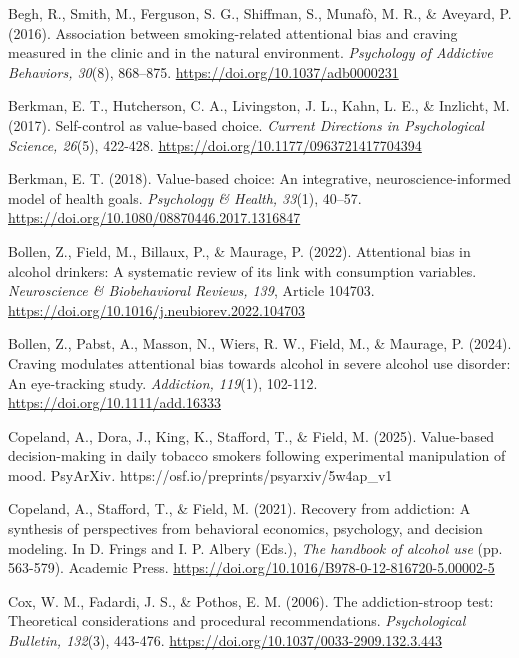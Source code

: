 \documentclass[authordate, empirical]{jote-new-article}
\begin{document}
	Begh, R., Smith, M., Ferguson, S. G., Shiffman, S., Munafò, M. R., \& Aveyard, P. (2016). Association between smoking-related attentional bias and craving measured in the clinic and in the natural environment. \emph{Psychology of Addictive Behaviors, 30}(8), 868--875. \url{https://doi.org/10.1037/adb0000231}



	Berkman, E. T., Hutcherson, C. A., Livingston, J. L., Kahn, L. E., \& Inzlicht, M. (2017). Self-control as value-based choice. \emph{Current Directions in Psychological Science, 26}(5), 422-428. \url{https://doi.org/10.1177/0963721417704394}



	Berkman, E. T. (2018). Value-based choice: An integrative, neuroscience-informed model of health goals. \emph{Psychology \& Health, 33}(1), 40--57. \url{https://doi.org/10.1080/08870446.2017.1316847}



	Bollen, Z., Field, M., Billaux, P., \& Maurage, P. (2022). Attentional bias in alcohol drinkers: A systematic review of its link with consumption variables. \emph{Neuroscience \& Biobehavioral Reviews, 139}, Article 104703. \url{https://doi.org/10.1016/j.neubiorev.2022.104703}



	Bollen, Z., Pabst, A., Masson, N., Wiers, R. W., Field, M., \& Maurage, P. (2024). Craving modulates attentional bias towards alcohol in severe alcohol use disorder: An eye-tracking study. \emph{Addiction, 119}(1), 102-112. \url{https://doi.org/10.1111/add.16333}



	Copeland, A., Dora, J., King, K., Stafford, T., \& Field, M. (2025). Value-based decision-making in daily tobacco smokers following experimental manipulation of mood. PsyArXiv\emph{. }https://osf.io/preprints/psyarxiv/5w4ap\_v1



	Copeland, A., Stafford, T., \& Field, M. (2021). Recovery from addiction: A synthesis of perspectives from behavioral economics, psychology, and decision modeling. In D. Frings and I. P. Albery (Eds.), \emph{The handbook of alcohol use} (pp. 563-579). Academic Press. \url{https://doi.org/10.1016/B978-0-12-816720-5.00002-5}



	Cox, W. M., Fadardi, J. S., \& Pothos, E. M. (2006). The addiction-stroop test: Theoretical considerations and procedural recommendations. \emph{Psychological Bulletin, 132}(3), 443-476. \url{https://doi.org/10.1037/0033-2909.132.3.443}
\end{document}
